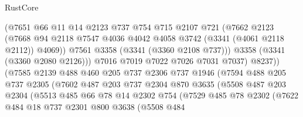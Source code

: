 \begin{lexlean}{RustCore}
\begin{coremodule}
                          (@7651
                            @66
                            @11
                            @14
                            @2123
                            @737
                            @754
                            @715
                            @2107
                            @721
                            (@7662
                              @2123
                              (@7668
                                @94
                                @2118
                                @7547
                                @4036
                                @4042
                                @4058
                                @3742
                                (@3341 (@4061 @2118 @2112))
                                @4069))
                            @7561
                            @3358
                            (@3341 (@3360 @2108 @737)))
                          @3358
                          (@3341 (@3360 @2080 @2126)))
                        @7016
                        @7019
                        @7022
                        @7026
                        @7031
                        @7037)
                      @8237))
                  (@7585
                    @2139
                    @488
                    @460
                    @205
                    @737
                    @2306
                    @737
                    @1946
                    (@7594
                      @488
                      @205
                      @737
                      @2305
                      (@7602
                        @487
                        @203
                        @737
                        @2304
                        @870
                        @3635
                        (@5508
                          @487
                          @203
                          @2304
                          (@5513
                            @485
                            @66
                            @78
                            @14
                            @2302
                            @754
                            (@7529
                              @485
                              @78
                              @2302
                              (@7622
                                @484
                                @18
                                @737
                                @2301
                                @800
                                @3638
                                (@5508
                                  @484

\end{coremodule}
\end{lexlean}
